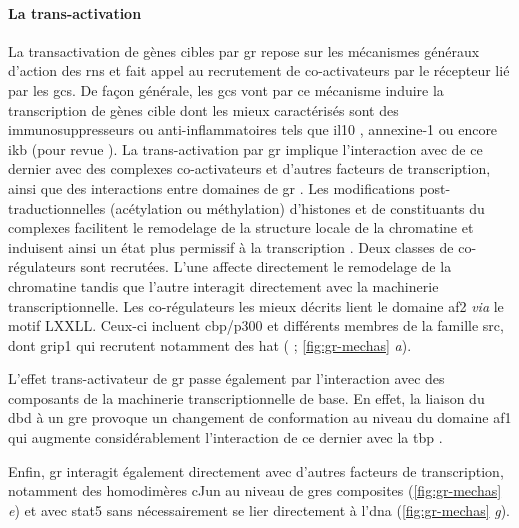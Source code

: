 \documentclass[../main.tex]{subfiles}
\begin{document}
\paragraph{La trans-activation}
La transactivation de gènes cibles par \gls{gr} repose sur les mécanismes généraux d'action des \glspl{rn} et fait appel au recrutement de co-activateurs par le récepteur lié par les \glspl{gc}.
De façon générale, les \glspl{gc} vont par ce mécanisme induire la transcription de gènes cible dont les mieux caractérisés sont des immunosuppresseurs ou anti-inflammatoires tels que \gls{il10} \citep{Mozo2004}, annexine-1 \citep{Philip1997} ou encore \gls{ikb} \citep{Auphan1995} (pour revue \citealp{Newton2000}).
La trans-activation par \gls{gr} implique l'interaction avec de ce dernier avec des complexes co-activateurs et d'autres facteurs de transcription, ainsi que des interactions entre domaines de \gls{gr} \citep{Bledsoe2002,Kumar2005}.
Les modifications post-traductionnelles (acétylation ou méthylation) d'histones et de constituants du complexes facilitent le remodelage de la structure locale de la chromatine et induisent ainsi un état plus permissif à la transcription \citep{Aranda2001}.
Deux classes de co-régulateurs sont recrutées.
L'une affecte directement le remodelage de la chromatine tandis que l'autre interagit directement avec la machinerie transcriptionnelle.
Les co-régulateurs les mieux décrits lient le domaine \gls{af2} \textit{via} le motif LXXLL.
Ceux-ci incluent \gls{cbp}/p300 et différents membres de la famille \gls{src}, dont \gls{grip1} qui recrutent notamment des \gls{hat} (\citep{Fryer1998} ; \autoref{fig:gr-mechas} \textit{a}).



L'effet trans-activateur de \gls{gr} passe également par l'interaction avec des composants de la machinerie transcriptionnelle de base.
En effet, la liaison du \gls{dbd} à un \gls{gre} provoque un changement de conformation au niveau du domaine \gls{af1} qui augmente considérablement l'interaction de ce dernier avec la \gls{tbp} \citep{Kumar2004}.
\par
Enfin, \gls{gr} interagit également directement avec d'autres facteurs de transcription, notamment des homodimères cJun au niveau de \glspl{gre} composites (\autoref{fig:gr-mechas} \textit{e}) et avec \gls{stat5} \citep{Stoecklin1997} sans nécessairement se lier directement à l'\gls{dna} (\autoref{fig:gr-mechas} \textit{g}).
\end{document}
